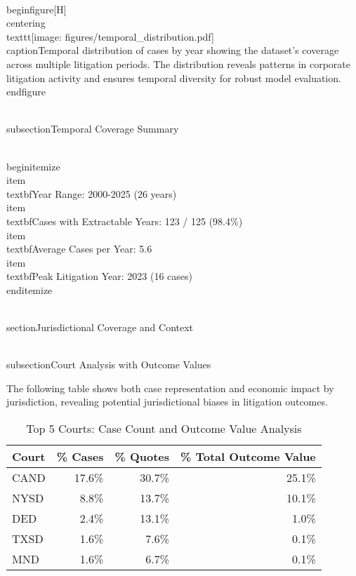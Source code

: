 \documentclass[11pt]{article}
\begin{document}
\\begin{figure}[H]
\\centering
\\texttt{[image: figures/temporal\_distribution.pdf]}
\\caption{Temporal distribution of cases by year showing the dataset's coverage across multiple litigation periods. The distribution reveals patterns in corporate litigation activity and ensures temporal diversity for robust model evaluation.}
\\end{figure}

\\subsection{Temporal Coverage Summary}

\\begin{itemize}
\\item \\textbf{Year Range}: 2000-2025 (26 years)
\\item \\textbf{Cases with Extractable Years}: 123 / 125 (98.4\%)
\\item \\textbf{Average Cases per Year}: 5.6
\\item \\textbf{Peak Litigation Year}: 2023 (16 cases)
\\end{itemize}

\\section{Jurisdictional Coverage and Context}

\\subsection{Court Analysis with Outcome Values}

The following table shows both case representation and economic impact by jurisdiction, revealing potential jurisdictional biases in litigation outcomes.

\begin{table}[H]
\centering
\caption{Top 5 Courts: Case Count and Outcome Value Analysis}
\begin{tabular}{lrrr}
\toprule
\textbf{Court} & \textbf{\% Cases} & \textbf{\% Quotes} & \textbf{\% Total Outcome Value} \\
\midrule
CAND & 17.6\% & 30.7\% & 25.1\% \\
NYSD & 8.8\% & 13.7\% & 10.1\% \\
DED & 2.4\% & 13.1\% & 1.0\% \\
TXSD & 1.6\% & 7.6\% & 0.1\% \\
MND & 1.6\% & 6.7\% & 0.1\% \\

\bottomrule
\end{tabular}
\end{table}
\end{document}
